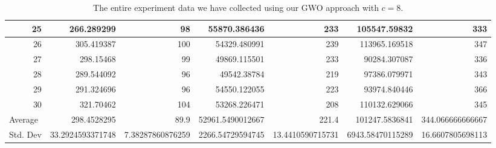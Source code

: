 \begin{table}
\begin{adjustwidth}{}{}
{{\begin{tabular}{|r|r|r|r|r|r|r|}
\hline
25                                         & 266.289299                   & 98                                    & 55870.386436                   & 233                                   & 105547.59832                 & 333                                    \\ 
\hline
26                                         & 305.419387                   & 100                                   & 54329.480991                   & 239                                   & 113965.169518                & 347                                    \\ 
\hline
27                                         & 298.15468                    & 99                                    & 49869.115501                   & 233                                   & 90284.307087                 & 336                                    \\ 
\hline
28                                         & 289.544092                   & 96                                    & 49542.38784                    & 219                                   & 97386.079971                 & 343                                    \\ 
\hline
29                                         & 291.324696                   & 96                                    & 54550.122055                   & 223                                   & 93974.840446                 & 366                                    \\ 
\hline
30                                         & 321.70462                    & 104                                   & 53268.226471                   & 208                                   & 110132.629066                & 345                                    \\ 
\hline
\multicolumn{1}{|l|}{Average}              & 298.4528295                  & 89.9                                  & 52961.5490012667               & 221.4                                 & 101247.5836841               & 344.066666666667                       \\ 
\hline
\multicolumn{1}{|l|}{Std. Dev}             & 33.2924593371748             & 7.38287860876259                      & 2266.54729594745               & 13.4410590715731                      & 6943.58470115289             & 16.6607805698113                       \\
\hline		
\end{tabular}}}
\end{adjustwidth}
\caption{The entire experiment data we have collected using our GWO approach with $c = 8$.}
\label{full-data-gwo-c8}
\end{table}

